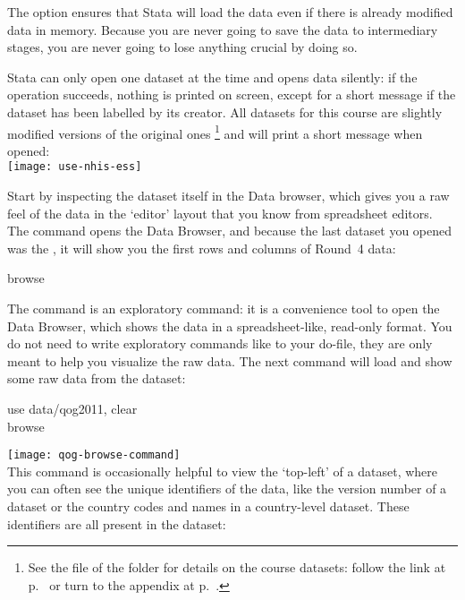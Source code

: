 	The  option ensures that Stata will load the data even if there is already modified data in memory. Because you are never going to save the data to intermediary stages, you are never going to lose anything crucial by doing so.%

	Stata can only open one dataset at the time and opens data silently: if the operation succeeds, nothing is printed on screen, except for a short message if the dataset has been labelled by its creator. All datasets for this course are slightly modified versions of the original ones%
		\footnote{See the \README file of the \data folder for details on the course datasets: follow the link at p.~\pageref{data-readme} or turn to the appendix at p.~\pageref{ch:data-sources}.} %
		and will print a short message when opened:\\[1em]

		\texttt{[image: use-nhis-ess]}

	 Start by inspecting the dataset itself in the Data browser, which gives you a raw feel of the data in the `editor' layout that you know from spreadsheet editors. The  command opens the Data Browser, and because the last dataset you opened was the \ess, it will show you the first rows and columns of \ESS Round~4 data:%

		\begin{docspec}
			browse
		\end{docspec}

	The  command is an exploratory command: it is a convenience tool to open the Data Browser, which shows the data in a spreadsheet-like, read-only format. You do not need to write exploratory commands like  to your do-file, they are only meant to help you visualize the raw data. The next command will load and show some raw data from the \qog dataset:\\[1em]%

		\begin{docspec}
			use data/qog2011, clear\\
			browse
		\end{docspec}
	
		\texttt{[image: qog-browse-command]}\\[1em]

	This command is occasionally helpful to view the `top-left' of a dataset, where you can often see the unique identifiers of the data, like the version number of a dataset or the country codes and names in a country-level dataset. These identifiers are all present in the \QOG dataset:%

